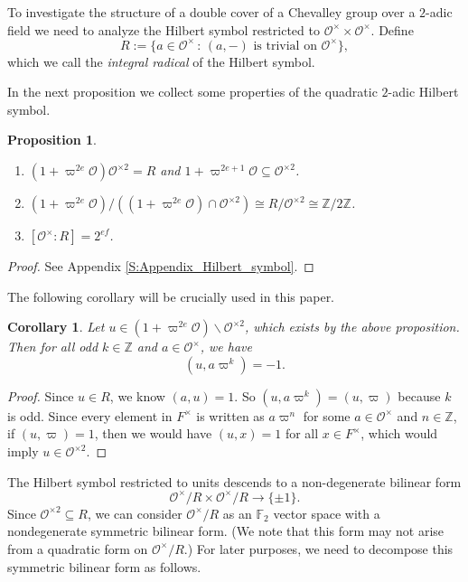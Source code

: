 \documentclass[10pt, letterpaper]{amsart}
\theoremstyle{plain}
\newtheorem{Cor}[equation]{Corollary}
\newtheorem{Prop}[equation]{Proposition}
\theoremstyle{definition}
\numberwithin{equation}{section}
\newcommand{\F}{\mathbb{F}}
\newcommand{\Z}{\mathbb{Z}}
\newcommand{\Ocal}{\mathcal{O}}
\newcommand{\st}{\,:\,}
\begin{document}
To investigate the structure of a double cover of a Chevalley group over a $2$-adic field we need to analyze the Hilbert symbol restricted to $\Ocal^\times\times\Ocal^\times$. Define
\begin{equation}\label{E:integral_radical_def}
R:=\{a\in\Ocal^\times\st \text{$(a, -)$ is trivial on $\Ocal^\times$}\},
\end{equation}
which we call the {\it integral radical} of the Hilbert symbol. 

In the next proposition we collect some properties of the quadratic $2$-adic Hilbert symbol.
\begin{Prop}\label{P:property_Hilber_symbol_not_in_Appendix}$ $
	\begin{enumerate}
		\item $(1+\varpi^{2e}\Ocal)\Ocal^{\times 2}= R$ and $1+\varpi^{2e+1}\Ocal\subseteq \Ocal^{\times 2}$. \label{ORad}
		\item $(1+\varpi^{2e}\Ocal)\slash((1+\varpi^{2e}\Ocal)\cap\Ocal^{\times 2})\cong R\slash\Ocal^{\times 2}\cong\Z\slash 2\Z$.
		\item $[\Ocal^{\times}:R]=2^{ef}$.
	\end{enumerate}
\end{Prop}
\begin{proof}
See Appendix \ref{S:Appendix_Hilbert_symbol}.
\end{proof}

The following corollary will be crucially used in this paper.
\begin{Cor}\label{C:Hilbert_symbol_unique_element_integral_radical}
Let $u\in (1+\varpi^{2e}\Ocal)\smallsetminus\Ocal^{\times 2}$, which exists by the above proposition. Then for all odd $k\in\Z$ and $a\in\Ocal^\times$, we have
\[
(u, a\varpi^k)=-1.
\]
\end{Cor}
\begin{proof}
Since $u\in R$, we know $(a, u)=1$. So $(u, a\varpi^k)=(u, \varpi)$ because $k$ is odd. Since every element in $F^\times$ is written as $a\varpi^n$ for some $a\in \Ocal^\times$ and $n\in\Z$, if $(u, \varpi)=1$, then we would have $(u, x)=1$ for all $x\in F^\times$, which would imply $u\in \Ocal^{\times 2}$.
\end{proof}


The Hilbert symbol restricted to units descends to a non-degenerate bilinear form
\[
\Ocal^\times\slash R\times\Ocal^\times\slash R\longrightarrow\{\pm 1\}.
\]
Since $\Ocal^{\times 2}\subseteq R$, we can consider $\Ocal^\times\slash R$ as an $\F_2$ vector space with a nondegenerate symmetric bilinear form. (We note that this form may not arise from a quadratic form on $\Ocal^\times\slash R$.) For later purposes, we need to decompose this symmetric bilinear form as follows.
\end{document}

